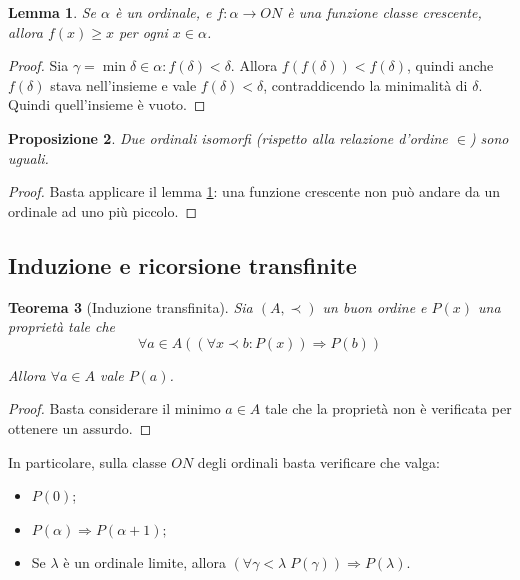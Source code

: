 \documentclass[a4paper,10pt,oneside]{article}
\theoremstyle{plain}
\newtheorem{mytheorem}{Teorema}[section]
\newtheorem{mylemma}[mytheorem]{Lemma}
\newtheorem{myprop}[mytheorem]{Proposizione}
\theoremstyle{definition}
\theoremstyle{remark}
\begin{document}
\begin{mylemma}\label{prop:fcresc}
 Se $\alpha$ è un ordinale, e $f:\alpha \rightarrow ON$ è una funzione classe crescente, allora $f(x)\ge x$ per ogni $x\in \alpha$.
\end{mylemma}
\begin{proof}
 Sia $\gamma = \min{\delta \in \alpha: f(\delta)<\delta}$. Allora $f(f(\delta))<f(\delta)$, quindi anche $f(\delta)$ stava nell'insieme e vale $f(\delta)<\delta$, contraddicendo la minimalità di $\delta$. Quindi quell'insieme è vuoto.
\end{proof}

\begin{myprop}
 Due ordinali isomorfi (rispetto alla relazione d'ordine $\in$) sono uguali.
\end{myprop}
\begin{proof}
 Basta applicare il lemma \ref{prop:fcresc}: una funzione crescente non può andare da un ordinale ad uno più piccolo.
\end{proof}



\subsection{Induzione e ricorsione transfinite}

\begin{mytheorem}[Induzione transfinita]
 
Sia $(A,\prec)$ un buon ordine e $P(x)$ una proprietà tale che \[\forall a\in A ((\forall x\prec b: P(x)) \Rightarrow P(b))\]

Allora $\forall a \in A$ vale $P(a)$.
\end{mytheorem}
\begin{proof}
 Basta considerare il minimo $a\in A$ tale che la proprietà non è verificata per ottenere un assurdo.
\end{proof}
In particolare, sulla classe $ON$ degli ordinali basta verificare che valga:
\begin{itemize}
 \item $P(0)$;
 \item $P(\alpha)\Rightarrow P(\alpha+1);$
 \item Se $\lambda$ è un ordinale limite, allora $(\forall \gamma<\lambda\; P(\gamma))\Rightarrow P(\lambda)$.
\end{itemize}
\end{document}
